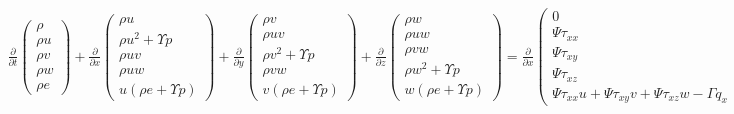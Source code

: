 \begin{align*}
\frac{\partial}{\partial t}
\begin{pmatrix}
\rho
\\
\rho u
\\
\rho v
\\
\rho w
\\
\rho e
\end{pmatrix}
+
\frac{\partial}{\partial x}
\begin{pmatrix}
\rho u
\\
\rho u^2 + \Upsilon p
\\
\rho uv
\\
\rho uw
\\
u\left(\rho e+\Upsilon p\right)
\end{pmatrix}
+
\frac{\partial}{\partial y}
\begin{pmatrix}
\rho v
\\
\rho uv
\\
\rho v^2 + \Upsilon p
\\
\rho vw
\\
v\left(\rho e+\Upsilon p\right)
\end{pmatrix}
+
\frac{\partial}{\partial z}
\begin{pmatrix}
\rho w
\\
\rho uw
\\
\rho vw
\\
\rho w^2 + \Upsilon p
\\
w\left(\rho e+\Upsilon p\right)
\end{pmatrix}
=
\frac{\partial}{\partial x}
\begin{pmatrix}
0
\\
\Psi \tau_{xx}
\\
\Psi \tau_{xy}
\\
\Psi \tau_{xz}
\\
\Psi \tau_{xx}u+\Psi \tau_{xy}v+\Psi \tau_{xz}w-\Gamma q_x
\end{pmatrix}
+\frac{\partial}{\partial y}
\begin{pmatrix}
0
\\
\Psi \tau_{yx}
\\
\Psi \tau_{yy}
\\
\Psi \tau_{yz}
\\
\Psi \tau_{yx}u+\Psi \tau_{yy}v+\Psi \tau_{yz}w-\Gamma q_y
\end{pmatrix}
+
\frac{\partial}{\partial z}
\begin{pmatrix}
0
\\
\Psi \tau_{zx}
\\
\Psi \tau_{zy}
\\
\Psi \tau_{zz}
\\
\Psi \tau_{zx}u+\Psi \tau_{zy}v+\Psi \tau_{zz}w-\Gamma q_z
\end{pmatrix}
\end{align*}


